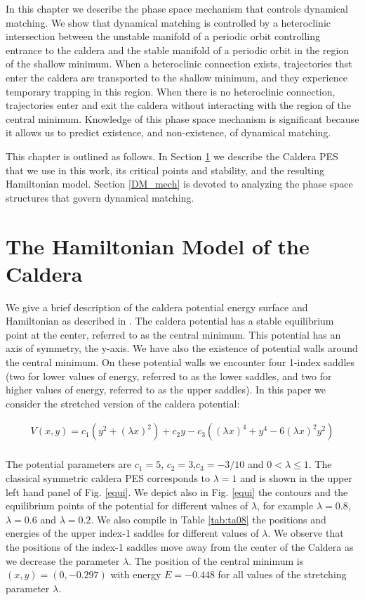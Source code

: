 \documentclass[a4paper,10pt]{article}
\begin{document}
In this chapter  we describe the phase space mechanism that controls dynamical matching. We show that  dynamical matching is controlled by a heteroclinic intersection between the unstable manifold of a periodic orbit controlling entrance to the caldera and the stable manifold of a periodic orbit  in the region of the shallow minimum.  When a heteroclinic connection exists, trajectories thst enter the caldera are transported to the shallow minimum, and they experience temporary trapping in this region. When there is no heteroclinic connection, trajectories enter and exit the caldera without interacting with the  region of the central minimum.  Knowledge of this phase space mechanism is significant because it allows us to predict existence, and non-existence, of dynamical matching.

This chapter is outlined as follows. In Section \ref{sec:model} we describe the Caldera PES that we use in this work, its critical points and stability, and the resulting Hamiltonian model. Section \ref{DM_mech} is devoted to analyzing the phase space structures that govern dynamical matching. 

 
\section{The Hamiltonian Model of the Caldera}
\label{sec:model}

 We give a brief description of the caldera potential energy surface and Hamiltonian as described in \cite{collins2014}. The caldera potential has a stable equilibrium point at the center, referred to as the central minimum. This potential has an axis of symmetry, the y-axis. We have also the existence of potential walls around the central minimum. On these potential walls we encounter four 1-index saddles (two for lower values of energy, referred to as the lower saddles,  and two for  higher values of energy, referred to as the upper saddles).  In this paper we consider the stretched version of the caldera potential: 


\begin{eqnarray}
\label{eq1}
V(x,y)=c_1(y^2+(\lambda x)^2) + c_2y - c_3((\lambda x)^4 + y^4 - 6 (\lambda x)^2 y^2)
\nonumber\\
\end{eqnarray}
 
 
 \noindent
 The potential parameters are  $c_1=5$, $c_2=3$,$c_3=-3/10$ and $0<\lambda \leq 1$. The classical symmetric caldera PES \cite{collins2014,katsanikas2018} corresponds to $\lambda = 1$ and is shown in the upper left hand panel of Fig. \ref{equi}. We depict also in Fig. \ref{equi} the contours and the equilibrium points of the potential for different values of $\lambda$, for example 
 $\lambda=0.8$, $\lambda=0.6$ and $\lambda=0.2$. We also compile in Table \ref{tab:ta08} the positions and energies of the upper index-1 saddles for different values of  $\lambda$. We observe that the positions of the index-1 saddles move away from the center of the Caldera as we decrease the parameter $\lambda$.  The position of the central minimum is $(x,y) = (0,-0.297)$ with energy $E = -0.448$ for all values of the stretching parameter $\lambda$.
 
\end{document}
